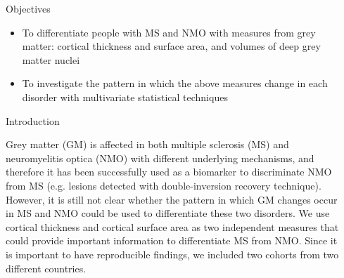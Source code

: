 \documentclass[final]{beamer}
\newlength{\sepwid}
\newlength{\onecolwid}
\begin{document}
\begin{frame}[t] %

\begin{columns}[t] %

\begin{column}{\sepwid}\end{column} %

\begin{column}{\onecolwid} %


\begin{alertblock}{Objectives}


\begin{itemize}
\item To differentiate people with MS and NMO with measures from grey matter: cortical thickness and 
surface area, and volumes of deep grey matter nuclei
\item To investigate the pattern in which the above measures change in each disorder with multivariate statistical techniques

\end{itemize}

\end{alertblock}


\begin{block}{Introduction}

Grey matter (GM) is affected in both multiple sclerosis (MS) and neuromyelitis optica (NMO) with different underlying mechanisms, and therefore it has been successfully used as a biomarker to discriminate NMO from MS (e.g. lesions detected with double-inversion recovery technique). 
However, it is still not clear whether the pattern in which GM changes occur in MS and NMO could be used to differentiate these  two disorders. We use cortical thickness and cortical surface area as two independent measures that could provide important information to differentiate MS from NMO. Since it is important to have reproducible findings, we included two cohorts from two different countries. 




\end{block}
\end{column}
\end{columns}
\end{frame}
\end{document}
